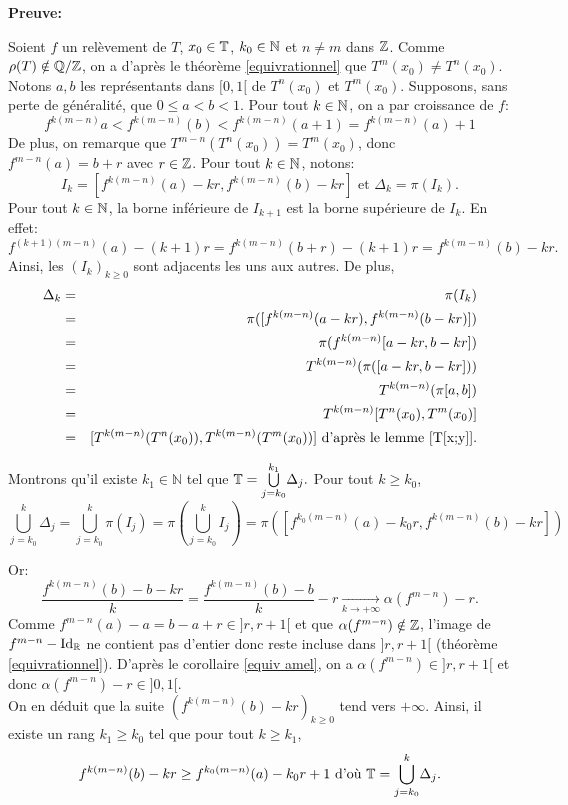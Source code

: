 	\textbf{Preuve:}
	\par Soient $f$ un relèvement de $T$, $x_0 \in {\mathbb{T}}$, $k_0 \in {\mathbb{N}}$ et $n\neq m$ dans ${\mathbb{Z}}$. Comme $\rho(T) \notin {\mathbb{Q}}/{\mathbb{Z}}$, on a d'après le théorème \ref{equivrationnel} que $T^m(x_0)\neq T^n(x_0)$. Notons $a,b$ les représentants dans $[0,1[$ de $T^n(x_0)$ et $T^m(x_0)$. Supposons, sans perte de généralité, que $0\leq a<b<1$. Pour tout $k \in {\mathbb{N}}$, on a par croissance de $f$:
	$$f^{k(m-n)}a<f^{k(m-n)}(b)<f^{k(m-n)}(a+1)=f^{k(m-n)}(a)+1$$
	De plus, on remarque que $T^{m-n}(T^n(x_0))=T^m(x_0)$, donc $f^{m-n}(a)=b+r$ avec $r\in {\mathbb{Z}}$. Pour tout $k\in {\mathbb{N}}$, notons:
	$$I_k=[f^{k(m-n)}(a)-kr,f^{k(m-n)}(b)-kr]\text{ et } \Delta_k=\pi(I_k).$$
	Pour tout $k\in {\mathbb{N}}$, la borne inférieure de $I_{k+1}$ est la borne supérieure de $I_k$. En effet:
	$$f^{(k+1)(m-n)}(a)-(k+1)r=f^{k(m-n)}(b+r)-(k+1)r=f^{k(m-n)}(b)-kr.$$
	Ainsi, les $(I_k)_{k\geq 0}$ sont adjacents les uns aux autres. De plus,
	\begin{eqnarray*}
		\Delta_k&=&\pi(I_k)\\
			&=&\pi([f^{k(m-n)}(a-kr),f^{k(m-n)}(b-kr)])\\
			&=&\pi( f^{k(m-n)}[a-kr,b-kr])\\
			&=&T^{k(m-n)}(\pi([a-kr,b-kr]))\\
			&=&T^{k(m-n)}(\pi[a,b])\\
			&=&T^{k(m-n)}[T^n(x_0),T^m(x_0)]\\
			&=&[T^{k(m-n)}(T^n(x_0)),T^{k(m-n)}(T^m(x_0))]\text{ d'après le lemme \ref{T[x;y]}}.
	\end{eqnarray*}


	\par Montrons qu'il existe $k_1\in \mathbb{N}$ tel que ${\mathbb{T}}=\overset{k_1}{\underset{j=k_0}{\bigcup}}\Delta_j.$ Pour tout $k\geq k_0$,
	$$\overset{k}{\underset{j=k_0}{\bigcup}}\Delta_j=\overset{k}{\underset{j=k_0}{\bigcup}}\pi(I_j)=\pi(\overset{k}{\underset{j=k_0}{\bigcup}}I_j)=\pi([f^{k_0(m-n)}(a)-k_0r,f^{k(m-n)}(b)-kr])$$

	Or:
	$$\frac{f^{k(m-n)}(b)-b-kr}{k}=\frac{f^{k(m-n)}(b)-b}{k}-r\underset{k\to +\infty}{\longrightarrow}\alpha(f^{m-n})-r.	$$
	Comme $f^{m-n}(a)-a=b-a+r \in ]r,r+1[$ et que $\alpha(f^{m-n})\notin {\mathbb{Z}}$, l'image de $f^{m-n} - \mathrm{Id}_{{\mathbb{R}}}$ ne contient pas d'entier donc reste incluse dans $]r,r+1[$ (théorème \ref{equivrationnel}). D'après le corollaire \ref{equiv amel}, on a $\alpha(f^{m-n})\in ]r,r+1[$ et donc $\alpha(f^{m-n})-r \in ]0,1[$.\\ On en déduit que la suite $(f^{k(m-n)}(b)-kr)_{k\geq0}$ tend vers $+\infty$. Ainsi, il existe un rang $k_1\geq k_0$ tel que pour tout $k\geq k_1$,
	$$f^{k(m-n)}(b)-kr\geq f^{k_0(m-n)}(a)-k_0r +1 \text{ d'où } {\mathbb{T}}=\overset{k}{\underset{j=k_0}{\bigcup}}\Delta_j.$$

